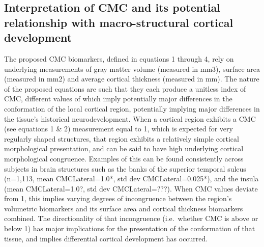 \documentclass{article}
\begin{document}
\subsection{Interpretation of CMC and its potential relationship with macro-structural cortical development}

The proposed CMC biomarkers, defined in equations 1 through 4, rely on
underlying measurements of gray matter volume (measured in mm3), surface area
(measured in mm2) and average cortical thickness (measured in mm). The nature
of the proposed equations are such that they each produce a unitless index of
CMC, different values of which imply potentially major differences in the
conformation of the local cortical region, potentially implying major
differences in the tissue's historical neurodevelopment. When a cortical
region exhibits a CMC (see equations 1 \& 2) measurement equal to 1, which is
expected for very regularly shaped structures, that region exhibits a
relatively simple cortical morphological presentation, and can be said to
have high underlying cortical morphological congruence. Examples of this can
be found consistently across subjects in brain structures such as the banks
of the superior temporal sulcus (n=1,113, mean CMCLateral=1.0*, std dev
CMCLateral=0.025*), and the insula (mean CMCLateral=1.0?, std dev
CMCLateral=???). When CMC values deviate from 1, this implies varying degrees
of incongruence between the region's volumetric biomarkers and its surface
area and cortical thickness biomarkers combined. The directionality of that
incongruence (i.e.\ whether CMC is above or below 1) has major implications
for the presentation of the conformation of that tissue, and implies
differential cortical development has occurred.
\end{document}
